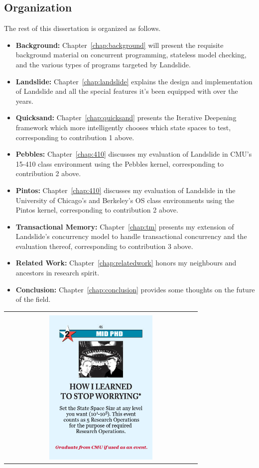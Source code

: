 \subsection{Organization}

The rest of this dissertation is organized as follows.

\begin{itemize}
	\item {\bf Background:} Chapter~\ref{chap:background} will present the requisite background material on concurrent programming, stateless model checking, and the various types of programs targeted by Landslide.
	\item {\bf Landslide:} Chapter~\ref{chap:landslide} explains the design and implementation of Landslide
		and all the special features it's been equipped with over the years.
	\item {\bf Quicksand:} Chapter~\ref{chap:quicksand} presents the Iterative Deepening framework which more intelligently chooses which state spaces to test, corresponding to contribution 1 above.
	\item {\bf Pebbles:} Chapter~\ref{chap:410} discusses my evaluation of Landslide in CMU's 15-410 class environment using the Pebbles kernel, corresponding to contribution 2 above.
	\item {\bf Pintos:} Chapter~\ref{chap:410} discusses my evaluation of Landslide in the University of Chicago's and Berkeley's OS class environments using the Pintos kernel, corresponding to contribution 2 above.
	\item {\bf Transactional Memory:} Chapter~\ref{chap:tm} presents my extension of Landslide's concurrency model to handle transactional concurrency and the evaluation thereof, corresponding to contribution 3 above.
	\item {\bf Related Work:} Chapter~\ref{chap:relatedwork} honors my neighbours and ancestors in research spirit.
	\item {\bf Conclusion:} Chapter~\ref{chap:conclusion} provides some thoughts on the future of the field.
\end{itemize}

\newpage
\thispagestyle{empty}
\begin{center}
\begin{tabular}{c}
\vspace{12em} \\
\includegraphics[width=0.55\textwidth]{how-i-learned.png}
\end{tabular}
\end{center}
